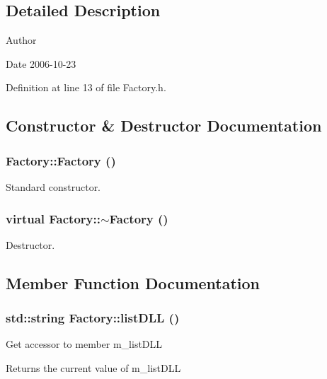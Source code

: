 \subsection{Detailed Description}
\begin{DoxyAuthor}{Author}

\end{DoxyAuthor}
\begin{DoxyDate}{Date}
2006-\/10-\/23 
\end{DoxyDate}


Definition at line 13 of file Factory.h.

\subsection{Constructor \& Destructor Documentation}
\hypertarget{classFactory_ac792bf88cfb7b6804b479529da5308cc}{
\subsubsection[{Factory}]{\setlength{\rightskip}{0pt plus 5cm}Factory::Factory ()}}
\label{classFactory_ac792bf88cfb7b6804b479529da5308cc}


Standard constructor. \hypertarget{classFactory_abb3d73c23bef3ca95487856ef0d7c476}{
\subsubsection[{$\sim$Factory}]{\setlength{\rightskip}{0pt plus 5cm}virtual Factory::$\sim$Factory ()}}
\label{classFactory_abb3d73c23bef3ca95487856ef0d7c476}


Destructor. 

\subsection{Member Function Documentation}
\hypertarget{classFactory_a21cd37e4b21b06e574cf67faea08782a}{
\subsubsection[{listDLL}]{\setlength{\rightskip}{0pt plus 5cm}std::string Factory::listDLL ()}}
\label{classFactory_a21cd37e4b21b06e574cf67faea08782a}
Get accessor to member m\_\-listDLL \begin{DoxyReturn}{Returns}
the current value of m\_\-listDLL 
\end{DoxyReturn}


